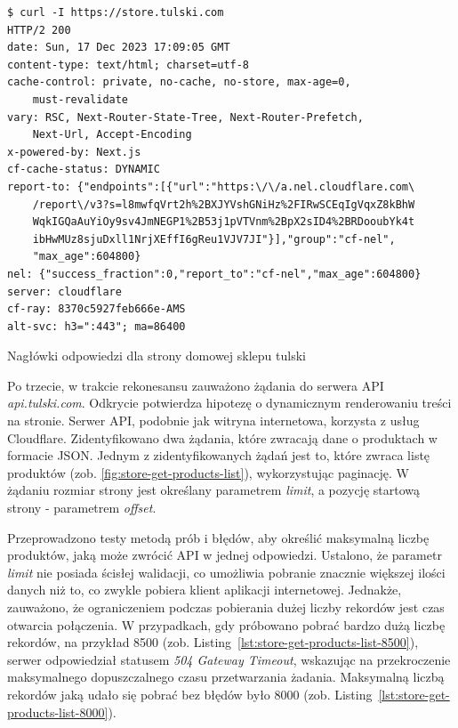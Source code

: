 \begin{listing}[H]
    \begin{verbatim}
$ curl -I https://store.tulski.com
HTTP/2 200
date: Sun, 17 Dec 2023 17:09:05 GMT
content-type: text/html; charset=utf-8
cache-control: private, no-cache, no-store, max-age=0,
    must-revalidate
vary: RSC, Next-Router-State-Tree, Next-Router-Prefetch,
    Next-Url, Accept-Encoding
x-powered-by: Next.js
cf-cache-status: DYNAMIC
report-to: {"endpoints":[{"url":"https:\/\/a.nel.cloudflare.com\
    /report\/v3?s=l8mwfqVrt2h%2BXJYVshGNiHz%2FIRwSCEqIgVqxZ8kBhW
    WqkIGQaAuYiOy9sv4JmNEGP1%2B53j1pVTVnm%2BpX2sID4%2BRDooubYk4t
    ibHwMUz8sjuDxll1NrjXEffI6gReu1VJV7JI"}],"group":"cf-nel",
    "max_age":604800}
nel: {"success_fraction":0,"report_to":"cf-nel","max_age":604800}
server: cloudflare
cf-ray: 8370c5927feb666e-AMS
alt-svc: h3=":443"; ma=86400
    \end{verbatim}
    \caption{Nagłówki odpowiedzi dla strony domowej sklepu tulski}
    \label{lst:rekonesans-get-homepage}
\end{listing}

Po trzecie, w trakcie rekonesansu zauważono żądania do serwera API \emph{api.tulski.com}.
Odkrycie potwierdza hipotezę o dynamicznym renderowaniu treści na stronie.
Serwer API, podobnie jak witryna internetowa, korzysta z usług Cloudflare.
Zidentyfikowano dwa żądania, które zwracają dane o produktach w formacie JSON\@.
Jednym z zidentyfikowanych żądań jest to, które zwraca listę produktów (zob. \autoref{fig:store-get-products-list}), wykorzystując paginację.
W żądaniu rozmiar strony jest określany parametrem \emph{limit}, a pozycję startową strony - parametrem \emph{offset}.

Przeprowadzono testy metodą prób i błędów, aby określić maksymalną liczbę produktów, jaką może zwrócić API w jednej odpowiedzi.
Ustalono, że parametr \emph{limit} nie posiada ścisłej walidacji, co umożliwia pobranie znacznie większej ilości danych niż to, co zwykle pobiera klient aplikacji internetowej.
Jednakże, zauważono, że ograniczeniem podczas pobierania dużej liczby rekordów jest czas otwarcia połączenia.
W przypadkach, gdy próbowano pobrać bardzo dużą liczbę rekordów, na przykład 8500 (zob. Listing~\ref{lst:store-get-products-list-8500}), serwer odpowiedział statusem \emph{504 Gateway Timeout}, wskazując na przekroczenie maksymalnego dopuszczalnego czasu przetwarzania żadania.
Maksymalną liczbą rekordów jaką udało się pobrać bez błędów było 8000 (zob. Listing~\ref{lst:store-get-products-list-8000}).


